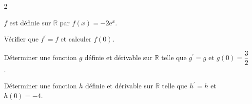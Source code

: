\documentclass[11pt,a4paper]{article}  %
\begin{document}
	\graphicspath{{img_oblig/}}
	
	\begin{center}
		
		
	\end{center}

\begin{multicols}{2}

$f$ est définie sur $\mathbb{R}$ par $f(x)=-2 \mathrm{e}^x$.

Vérifier que $f^{\prime}=f$ et calculer $f(0)$.



Déterminer une fonction $g$ définie et dérivable sur $\mathbb{R}$ telle que $g^{\prime}=g$ et $g(0)=\dfrac{3}{2}$.
\columnbreak



Déterminer une fonction $h$ définie et dérivable sur $\mathbb{R}$ telle que $h^{\prime}=h$ et $h(0)=-4$.
\end{multicols}
\end{document}
